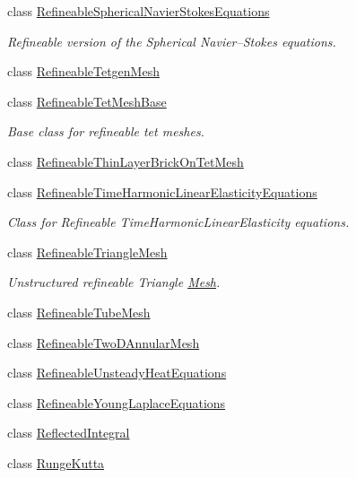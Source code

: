 \begin{DoxyCompactItemize}
class \hyperlink{classoomph_1_1RefineableSphericalNavierStokesEquations}{Refineable\+Spherical\+Navier\+Stokes\+Equations}
\begin{DoxyCompactList}\small\item\em Refineable version of the Spherical Navier--Stokes equations. \end{DoxyCompactList}\item 
class \hyperlink{classoomph_1_1RefineableTetgenMesh}{Refineable\+Tetgen\+Mesh}
\item 
class \hyperlink{classoomph_1_1RefineableTetMeshBase}{Refineable\+Tet\+Mesh\+Base}
\begin{DoxyCompactList}\small\item\em Base class for refineable tet meshes. \end{DoxyCompactList}\item 
class \hyperlink{classoomph_1_1RefineableThinLayerBrickOnTetMesh}{Refineable\+Thin\+Layer\+Brick\+On\+Tet\+Mesh}
\item 
class \hyperlink{classoomph_1_1RefineableTimeHarmonicLinearElasticityEquations}{Refineable\+Time\+Harmonic\+Linear\+Elasticity\+Equations}
\begin{DoxyCompactList}\small\item\em Class for Refineable Time\+Harmonic\+Linear\+Elasticity equations. \end{DoxyCompactList}\item 
class \hyperlink{classoomph_1_1RefineableTriangleMesh}{Refineable\+Triangle\+Mesh}
\begin{DoxyCompactList}\small\item\em Unstructured refineable Triangle \hyperlink{classoomph_1_1Mesh}{Mesh}. \end{DoxyCompactList}\item 
class \hyperlink{classoomph_1_1RefineableTubeMesh}{Refineable\+Tube\+Mesh}
\item 
class \hyperlink{classoomph_1_1RefineableTwoDAnnularMesh}{Refineable\+Two\+D\+Annular\+Mesh}
\item 
class \hyperlink{classoomph_1_1RefineableUnsteadyHeatEquations}{Refineable\+Unsteady\+Heat\+Equations}
\item 
class \hyperlink{classoomph_1_1RefineableYoungLaplaceEquations}{Refineable\+Young\+Laplace\+Equations}
\item 
class \hyperlink{classoomph_1_1ReflectedIntegral}{Reflected\+Integral}
\item 
class \hyperlink{classoomph_1_1RungeKutta}{Runge\+Kutta}
\item 

\end{DoxyCompactItemize}
